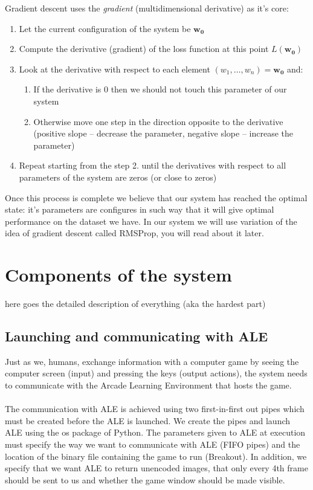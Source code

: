 \documentclass[a4paper,12pt]{article}
\begin{document}
Gradient descent uses the \emph{gradient} (multidimensional derivative) as it's core:
\begin{enumerate}
	\item Let the current configuration of the system be $\mathbf{w_0}$
	\item Compute the derivative (gradient) of the loss function at this point $L(\mathbf{w_0})$
	\item Look at the derivative with respect to each element $(w_1, \ldots, w_n) = \mathbf{w_0}$ and:
	\begin{enumerate}
		\item If the derivative is 0 then we should not touch this parameter of our system
		\item Otherwise move one step in the direction opposite to the derivative (positive slope -- decrease the parameter, negative slope -- increase the parameter)
	\end{enumerate}
	\item Repeat starting from the step 2. until the derivatives with respect to all parameters of the system are zeros (or close to zeros)
\end{enumerate}
Once this process is complete we believe that our system has reached the optimal state: it's parameters are configures in such way that it will give optimal performance on the dataset we have. In our system we will use variation of the idea of gradient descent called RMSProp, you will read about it later.



%
%
\section{Components of the system}
here goes the detailed description of everything (aka the hardest part)


\subsection{Launching and communicating with ALE}

Just as we, humans, exchange information with a computer game by seeing the computer screen (input) and pressing the keys (output actions), the system needs to communicate with the Arcade Learning Environment that hosts the game.
\paragraph{}
The communication with ALE is achieved using two first-in-first out pipes which must be created before the ALE is launched. We create the pipes and launch ALE using the os package of Python. The parameters given to ALE at execution must specify the way we want to communicate with ALE (FIFO pipes) and the location of the binary file containing the game to run (Breakout). In addition, we specify that we want ALE to return unencoded images, that only every 4th frame should be sent to us and whether the game window should be made visible.
\end{document}
